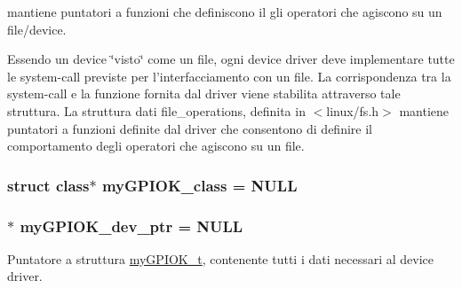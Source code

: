 mantiene puntatori a funzioni che definiscono il gli operatori che agiscono su un file/device. 

Essendo un device \char`\"{}visto\char`\"{} come un file, ogni device driver deve implementare tutte le system-\/call previste per l'interfacciamento con un file. La corrispondenza tra la system-\/call e la funzione fornita dal driver viene stabilita attraverso tale struttura. La struttura dati file\+\_\+operations, definita in $<$linux/fs.\+h$>$ mantiene puntatori a funzioni definite dal driver che consentono di definire il comportamento degli operatori che agiscono su un file. \hypertarget{group___linux-_driver_gaaf8d1bce7d6389684a037e94381c275c}{
\subsubsection[{my\+G\+P\+I\+O\+K\+\_\+class}]{\setlength{\rightskip}{0pt plus 5cm}struct class$\ast$ my\+G\+P\+I\+O\+K\+\_\+class = N\+U\+L\+L\hspace{0.3cm}{\ttfamily [static]}}}\label{group___linux-_driver_gaaf8d1bce7d6389684a037e94381c275c}
\hypertarget{group___linux-_driver_gae370dfc26b06b6cc24a7bcc152f4969e}{
\subsubsection[{my\+G\+P\+I\+O\+K\+\_\+dev\+\_\+ptr}]{$\ast$ my\+G\+P\+I\+O\+K\+\_\+dev\+\_\+ptr = N\+U\+L\+L}}\label{group___linux-_driver_gae370dfc26b06b6cc24a7bcc152f4969e}


Puntatore a struttura \hyperlink{structmy_g_p_i_o_k__t}{my\+G\+P\+I\+O\+K\+\_\+t}, contenente tutti i dati necessari al device driver. 


